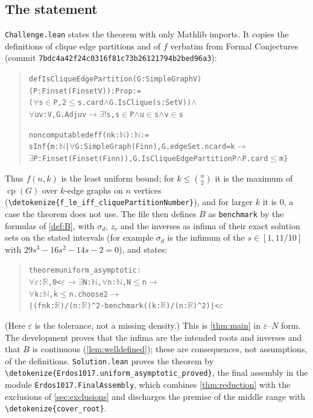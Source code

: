 \documentclass[10pt]{article}
\theoremstyle{definition}
\theoremstyle{remark}
\numberwithin{equation}{section}
\newcommand{\cp}{\operatorname{cp}}
\newcommand{\eps}{\varepsilon}
\newcommand{\lean}[1]{\texttt{#1}}
\newcommand{\leanid}[1]{\expandafter\nolinkurl\expandafter{\detokenize{#1}}}
\newenvironment{leanlisting}{\begin{quote}\footnotesize\begin{alltt}}{\end{alltt}\end{quote}}
\begin{document}
\subsection{The statement}
\lean{Challenge.lean} states the theorem with only Mathlib imports. It copies the definitions of clique edge partitions and of $f$ verbatim from Formal Conjectures~\cite{FC} (commit \texttt{7bdc4a42f24c0316f81c\allowbreak 73b26121794b2bed96a3}):
\begin{leanlisting}
def IsCliqueEdgePartition (G : SimpleGraph V) (P : Finset (Finset V)) : Prop :=
  (\(\forall\) s \(\in\) P, 2 \(\le\) s.card \(\wedge\) G.IsClique (s : Set V)) \(\wedge\)
  \(\forall\) u v : V, G.Adj u v \(\to\) \(\exists!\) s, s \(\in\) P \(\wedge\) u \(\in\) s \(\wedge\) v \(\in\) s

noncomputable def f (n k : \(\mathbb{N}\)) : \(\mathbb{N}\) :=
  sInf \{m : \(\mathbb{N}\) | \(\forall\) G : SimpleGraph (Fin n), G.edgeSet.ncard = k \(\to\)
    \(\exists\) P : Finset (Finset (Fin n)), G.IsCliqueEdgePartition P \(\wedge\) P.card \(\le\) m\}
\end{leanlisting}
Thus $f(n,k)$ is the least uniform bound; for $k\le\binom n2$ it is the maximum of $\cp(G)$ over $k$-edge graphs on $n$ vertices (\leanid{f_le_iff_cliquePartitionNumber}), and for larger $k$ it is $0$, a case the theorem does not use. The file then defines $B$ as \lean{benchmark} by the formulas of \cref{def:B}, with $\sigma_d$, $z_c$ and the inverses as infima of their exact solution sets on the stated intervals (for example $\sigma_d$ is the infimum of the $s\in[1,11/10]$ with $29s^3-16s^2-14s-2=0$), and states:
\begin{leanlisting}
theorem uniform_asymptotic :
    \(\forall\) \(\varepsilon\) : \(\mathbb{R}\), 0 < \(\varepsilon\) \(\to\) \(\exists\) N : \(\mathbb{N}\), \(\forall\) n : \(\mathbb{N}\), N \(\le\) n \(\to\)
      \(\forall\) k : \(\mathbb{N}\), k \(\le\) n.choose 2 \(\to\)
        |(f n k : \(\mathbb{R}\)) / (n : \(\mathbb{R}\)) ^ 2 - benchmark ((k : \(\mathbb{R}\)) / (n : \(\mathbb{R}\)) ^ 2)| < \(\varepsilon\)
\end{leanlisting}
(Here $\eps$ is the tolerance, not a missing density.) This is \cref{thm:main} in $\eps$--$N$ form. The development proves that the infima are the intended roots and inverses and that $B$ is continuous (\cref{lem:welldefined}); these are consequences, not assumptions, of the definitions. \lean{Solution.lean} proves the theorem by \leanid{Erdos1017.uniform_asymptotic_proved}, the final assembly in the module \lean{Erdos1017.FinalAssembly}, which combines \cref{thm:reduction} with the exclusions of \cref{sec:exclusions} and discharges the premise of the middle range with \leanid{cover_root}.
\end{document}

